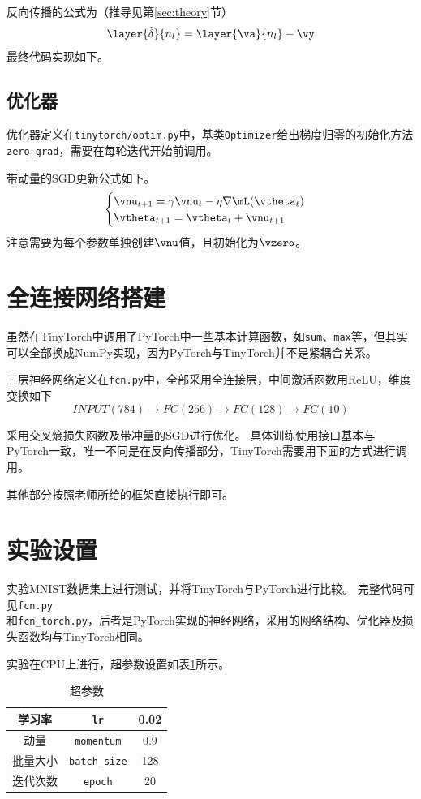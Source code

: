 \documentclass[logo,reportComp]{thesis}
\begin{document}
反向传播的公式为（推导见第\ref{sec:theory}节）
\[\layer{\tilde{\delta}}{n_l}=\layer{\va}{n_l}-\vy\]
最终代码实现如下。


\subsection{优化器}
优化器定义在\verb'tinytorch/optim.py'中，基类\verb'Optimizer'给出梯度归零的初始化方法\verb'zero_grad'，需要在每轮迭代开始前调用。

带动量的SGD更新公式如下。
\[\begin{cases}
    \vnu_{t+1}=\gamma\vnu_t-\eta\nabla\mL(\vtheta_t)\\
    \vtheta_{t+1}=\vtheta_t+\vnu_{t+1}
\end{cases}\]
注意需要为每个参数单独创建$\vnu$值，且初始化为$\vzero$。


\section{全连接网络搭建}
虽然在TinyTorch中调用了PyTorch中一些基本计算函数，如\verb'sum'、\verb'max'等，但其实可以全部换成NumPy实现，因为PyTorch与TinyTorch并不是紧耦合关系。

三层神经网络定义在\verb'fcn.py'中，全部采用全连接层，中间激活函数用ReLU，维度变换如下
\[INPUT(784)\to FC(256)\to FC(128)\to FC(10)\]


采用交叉熵损失函数及带冲量的SGD进行优化。
具体训练使用接口基本与PyTorch一致，唯一不同是在反向传播部分，TinyTorch需要用下面的方式进行调用。

其他部分按照老师所给的框架直接执行即可。

\section{实验设置}
实验MNIST数据集上进行测试，并将TinyTorch与PyTorch进行比较。
完整代码可见\verb'fcn.py'\\
和\verb'fcn_torch.py'，后者是PyTorch实现的神经网络，采用的网络结构、优化器及损失函数均与TinyTorch相同。

实验在CPU上进行，超参数设置如表\ref{tab:hyper}所示。
\begin{table}[H]
\centering
\caption{超参数}
\label{tab:hyper}
\begin{tabular}{|c|c|c|}\hline
学习率 & \verb'lr' & 0.02 \\\hline
动量 & \verb'momentum' & 0.9 \\\hline
批量大小 & \verb'batch_size' & 128 \\\hline
迭代次数 & \verb'epoch' & 20 \\\hline
\end{tabular}
\end{table}
\end{document}
